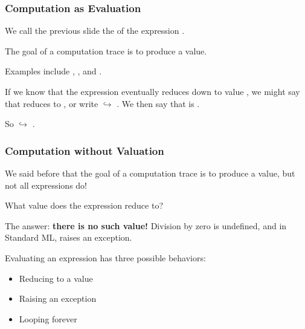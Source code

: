 \documentclass[aspectratio=169]{beamer}
\begin{document}
\begin{frame}[plain]
  \frametitle{Computation as Evaluation}

  We call the previous slide the  of the expression . \\ 

  \vspace{5pt}

  The goal of a computation trace is to produce a value.

  \pause

  \vspace{10pt}


  \pause
  \vspace{\fill}


  \vspace{5pt}

  Examples include , , and .

  \pause
  \vspace{\fill}

  If we know that the expression  eventually reduces down to value , we might
  say that  reduces to , or write  $\hookrightarrow$ . We then say
  that  is .

  \vspace{5pt}

  So  $\hookrightarrow$ .

\end{frame}

\begin{frame}[plain]
  \frametitle{Computation without Valuation}

  We said before that the goal of a computation trace is to produce a value, but not 
  all expressions do!

  \pause
  \vspace{\fill}

  What value does the expression  reduce to?

  \pause
  \vspace{\fill}

  The answer: \textbf{there is no such value!} Division by zero is undefined, and in
  Standard ML, raises an exception.

  \pause
  \vspace{\fill}

  Evaluating an expression has three possible behaviors:
  \begin{itemize}
    \item Reducing to a value
    \item Raising an exception
    \item Looping forever
  \end{itemize}

\end{frame}
\end{document}
